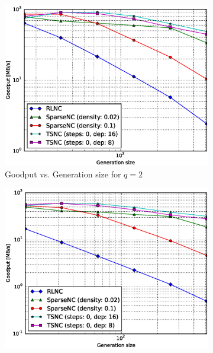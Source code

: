 \begin{figure}
    \centering
    \begin{subfigure}[b]{0.475\textwidth}
        \centering
        \includegraphics[width=1.15\textwidth]{images/23_07_2015/goodput_vs_generation_size_Rasp_v2_encoder_Binary_1600.eps}
        \caption[]%
        {{\small Goodput vs. Generation size for $q = 2$}}
        \label{fig:enc_good_rasp2_gen_gf2}
    \end{subfigure}
    \hfill
    \begin{subfigure}[b]{0.475\textwidth}
        \centering
        \includegraphics[width=1.15\textwidth]{images/23_07_2015/goodput_vs_generation_size_Rasp_v2_encoder_Binary8_1600.eps}

\end{subfigure}
\end{figure}
